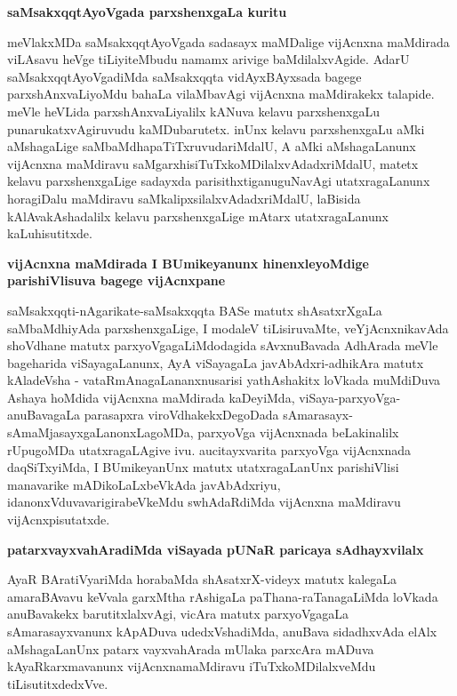 {\bigskip
\noindent
{\large\bf saMsakxqqtAyoVgada parxshenxgaLa kuritu}}\label{page29}
\medskip

\noindent
meVlakxMDa saMsakxqqtAyoVgada sadasayx maMDalige vijAcnxna maMdirada viLAsavu heVge tiLiyiteMbudu \-namamx arivige baMdilalxvAgide. AdarU saMsakxqqtAyoVgadiMda saMsakxqqta vidAyxBAyxsada bagege parxshAnxvaLi\-yoMdu bahaLa vilaMbavAgi vijAcnxna maMdirakekx talapide. meVle heVLida parxshAnxvaLiyalilx kANuva kelavu parxshenx\-gaLu punarukatx\-vAgiruvudu kaMDubarutetx. inUnx kelavu parxshenx\-gaLu aMki aMshagaLige saMbaMdha\-paTiTxru\-vuda\-riMdalU, A aMki aMshagaLanunx vijAcnxna maMdiravu saMgarxhisiTuTx\break\-koMDilalxvAdadxriMdalU, matetx kelavu parxshenxgaLige sadayxda parisithxtiganuguNavAgi utatxra\-gaLanunx horagiDalu maMdiravu saMkalipxsilalxvAdadx\-riMdalU, laBisida kAlAvakAsha\-dalilx kelavu parxshenxgaLige mAtarx utatxragaLanunx kaLuhisutitxde.

{\bigskip
\noindent
{\large\bf vijAcnxna maMdirada I BUmikeyanunx hinenxleyoMdige parishiVlisuva bagege vijAcnxpane}}\label{page29a}
\medskip

\noindent
saMsakxqqti-nAgarikate-saMsakxqqta BASe matutx shAsatxrXgaLa saMbaMdhiyAda parxshenxgaLige, I modaleV tiLisiru\-vaMte, veYjAcnxnikavAda shoVdhane matutx parxyoVgagaLiMdodagida sAvxnuBavada AdhArada meVle bage\-harida viSayagaLanunx, AyA viSayagaLa javA\-bAdxri-adhikAra matutx kAladeVsha - vataRmAnagaLananxnusarisi \-yathA\-shakitx loVkada muMdiDuva Ashaya hoMdida vijAcnxna maMdirada kaDeyiMda, viSaya-parxyoVga-\-anuBava\-gaLa parasapxra viroVdhakekxDegoDada sAmarasayx-sAmaMjasayxgaLanonxLagoMDa, parxyoVga vijAcnxnada beLaki\-nalilx rUpugoMDa utatxragaLAgive ivu. aucitayxvarita parxyoVga vijAcnxnada daqSiTxyiMda, I BUmike\-yanUnx matutx utatxragaLanUnx pari\-shiVlisi manavarike mADikoLaLxbeVkAda javAbAdxriyu, idanonxVdu\-vavari\-gira\break\-beVkeMdu swhAdaRdiMda vijAcnxna maMdiravu vijAcnxpisutatxde.

{\bigskip
\noindent
{\large\bf patarxvayxvahAradiMda viSayada pUNaR paricaya sAdhayxvilalx}}\label{page30e}
\medskip

\noindent
AyaR BAratiVyariMda horabaMda shAsatxrX-videyx matutx kalegaLa amaraBAvavu keVvala garxMtha rAshi\-gaLa paThana-raTanagaLiMda loVkada anuBavakekx barutitxlalxvAgi, vicAra matutx parxyoVgagaLa sAma\-rasayx\-vanunx kApA\-Duva udedxVshadiMda, anuBava sidadhxvAda elAlx aMshagaLanUnx patarx vayxvahArada mUlaka parxcAra \-mADuva kAyaRkarxmavanunx vijAcnxnamaMdiravu iTuTxkoMDilalxveMdu tiLisutitxdedxVve.

